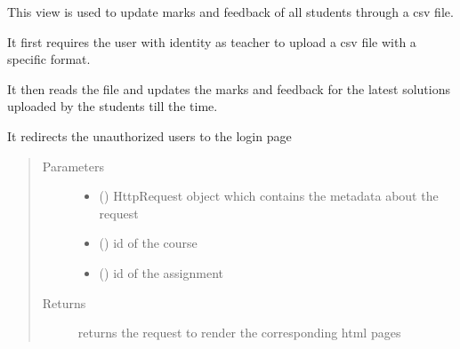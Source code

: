 \documentclass[letterpaper,10pt,english]{sphinxmanual}
\begin{document}

\begin{fulllineitems}
\label{\detokenize{users:users.views.marks}}
\sphinxAtStartPar
This view is used to update marks and feedback of all students through a csv file.

\sphinxAtStartPar
It first requires the user with identity as teacher to upload a csv file with a specific format.

\sphinxAtStartPar
It then reads the file and updates the marks and feedback for the latest solutions uploaded by the students till the time.

\sphinxAtStartPar
It redirects the unauthorized users to the login page
\begin{quote}\begin{description}
\item[{Parameters}] \leavevmode\begin{itemize}
\item {} 
\sphinxAtStartPar
{} () \textendash{} HttpRequest object which contains the metadata about the request

\item {} 
\sphinxAtStartPar
{} () \textendash{} id of the course

\item {} 
\sphinxAtStartPar
{} () \textendash{} id of the assignment

\end{itemize}

\item[{Returns}] \leavevmode
\sphinxAtStartPar
returns the request to render the corresponding html pages

\end{description}\end{quote}

\end{fulllineitems}

\end{document}
